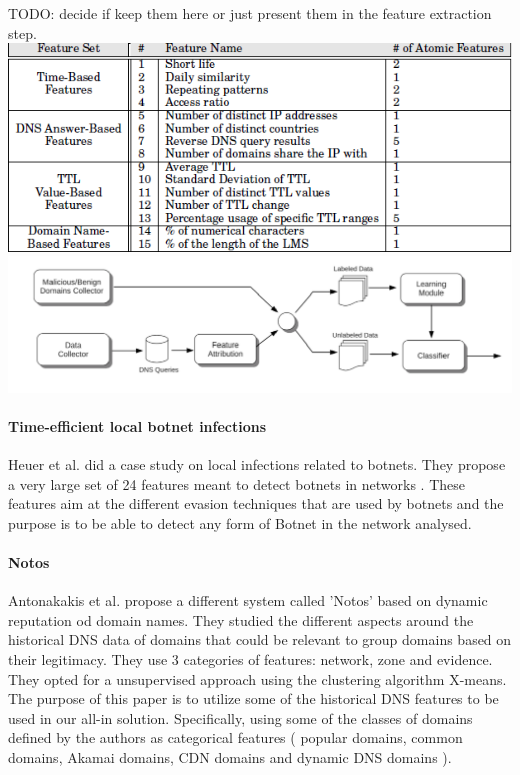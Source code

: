 TODO: decide if keep them here or just present them in the feature extraction step.
\includegraphics[scale=.3]{img/exposure_features.png}
\includegraphics[scale=.3]{img/exposure_architecture.png}


\paragraph{Time-efficient local botnet infections}
Heuer et al. did a case study on local infections related to botnets\cite{localbotnet}. They propose a very large set of 24 features meant to detect botnets in networks . These features aim at the different evasion techniques that are used by botnets and the purpose is to be able to detect any form of Botnet in the network analysed.\\

\paragraph{Notos}
Antonakakis et al. \cite{dns-reputation} propose a different system called 'Notos' based on dynamic reputation od domain names. They studied the different aspects around the historical DNS data of domains that could be relevant to group domains based on their legitimacy. They use 3 categories of features: network, zone and evidence. They opted for a unsupervised approach using the clustering algorithm X-means. The purpose of this paper is to utilize some of the historical DNS features to be used in our all-in solution. Specifically, using some of the classes of domains defined by the authors as categorical features ( popular domains, common domains, Akamai domains,  CDN domains and dynamic DNS domains ).


